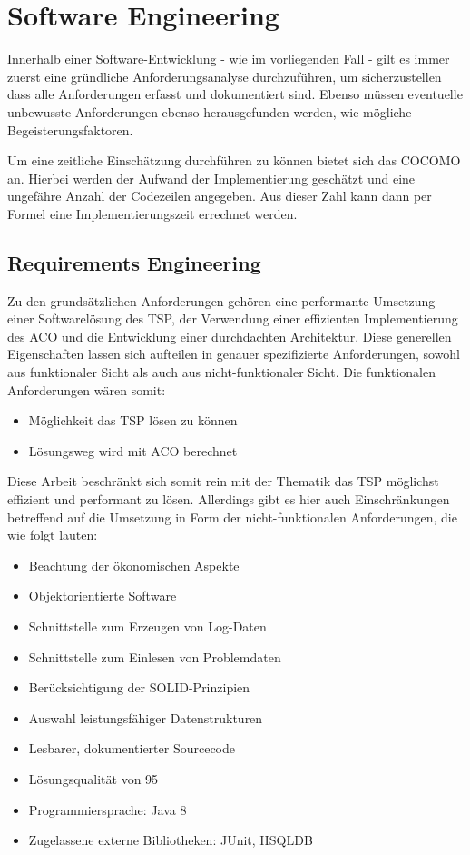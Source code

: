 \section{Software Engineering}{
Innerhalb einer Software-Entwicklung - wie im vorliegenden Fall - gilt es immer zuerst eine gründliche Anforderungsanalyse durchzuführen, um sicherzustellen dass alle Anforderungen erfasst und dokumentiert sind. Ebenso müssen eventuelle unbewusste Anforderungen ebenso herausgefunden werden, wie mögliche Begeisterungsfaktoren.

Um eine zeitliche Einschätzung durchführen zu können bietet sich das \ac{COCOMO} an. Hierbei werden der Aufwand der Implementierung geschätzt und eine ungefähre Anzahl der Codezeilen angegeben. Aus dieser Zahl kann dann per Formel eine Implementierungszeit errechnet werden. 

	\subsection{Requirements Engineering}
	Zu den grundsätzlichen Anforderungen gehören eine performante Umsetzung einer Softwarelösung des \ac{TSP}, der Verwendung einer effizienten Implementierung des \ac{ACO} und die Entwicklung einer durchdachten Architektur.
	Diese generellen Eigenschaften lassen sich aufteilen in genauer spezifizierte Anforderungen, sowohl aus funktionaler Sicht als auch aus nicht-funktionaler Sicht. Die funktionalen Anforderungen wären somit:
	\begin{itemize}
		\item Möglichkeit das \ac{TSP} lösen zu können
		\item Lösungsweg wird mit \ac{ACO} berechnet
	\end{itemize}
	Diese Arbeit beschränkt sich somit rein mit der Thematik das TSP möglichst effizient und performant zu lösen. Allerdings gibt es hier auch Einschränkungen betreffend auf die Umsetzung in Form der nicht-funktionalen Anforderungen, die wie folgt lauten:		
	\begin{itemize}
		\item Beachtung der ökonomischen Aspekte
		\item Objektorientierte Software
		\item Schnittstelle zum Erzeugen von Log-Daten
		\item Schnittstelle zum Einlesen von Problemdaten
		\item Berücksichtigung der SOLID-Prinzipien
		\item Auswahl leistungsfähiger Datenstrukturen
		\item Lesbarer, dokumentierter Sourcecode
		\item Lösungsqualität von 95%
		\item Programmiersprache: Java 8
		\item Zugelassene externe Bibliotheken: JUnit, HSQLDB
	\end{itemize}
	
}
